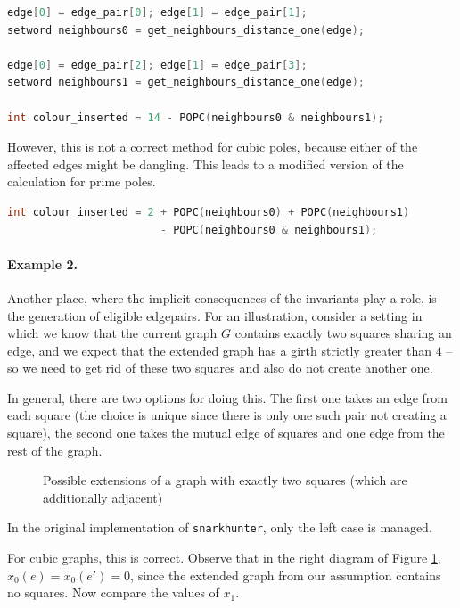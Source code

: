 \begin{lstlisting}[language=C]
edge[0] = edge_pair[0]; edge[1] = edge_pair[1];
setword neighbours0 = get_neighbours_distance_one(edge);

edge[0] = edge_pair[2]; edge[1] = edge_pair[3];
setword neighbours1 = get_neighbours_distance_one(edge);

int colour_inserted = 14 - POPC(neighbours0 & neighbours1);
\end{lstlisting}

However, this is not a correct method for cubic poles, because either of the affected edges might be dangling. This leads to a modified version of the calculation for prime poles.

\begin{lstlisting}[language=C]
int colour_inserted = 2 + POPC(neighbours0) + POPC(neighbours1)
                        - POPC(neighbours0 & neighbours1);
\end{lstlisting}

\paragraph{Example 2.} Another place, where the implicit consequences of the invariants play a role, is the generation of eligible edgepairs. For an illustration, consider a setting in which we know that the current graph $G$ contains exactly two squares sharing an edge, and we expect that the extended graph has a girth strictly greater than $4$ -- so we need to get rid of these two squares and also do not create another one.

In general, there are two options for doing this. The first one takes an edge from each square (the choice is unique since there is only one such pair not creating a square), the second one takes the mutual edge of squares and one edge from the rest of the graph.

\begin{figure}[h!]
    \centering
    
    \caption{Possible extensions of a graph with exactly two squares (which are additionally adjacent)}
    \label{fig:polehunter_adjacent_squares}
\end{figure}

In the original implementation of \texttt{snarkhunter}, only the left case is managed.

For cubic graphs, this is correct. Observe that in the right diagram of Figure \ref{fig:polehunter_adjacent_squares}, $x_0(e)=x_0(e')=0$, since the extended graph from our assumption contains no squares. Now compare the values of $x_1$.

